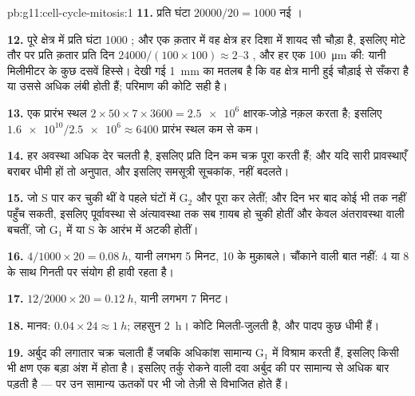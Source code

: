 \begin{solution}{pb:g11:cell-cycle-mitosis:1}
\textbf{11.} प्रति घंटा $\num{20000}/20 = 1000$ नई ।

\textbf{12.} पूरे क्षेत्र में प्रति घंटा 1000 ; और एक क़तार में
वह क्षेत्र हर दिशा में शायद सौ  चौड़ा है, इसलिए मोटे तौर पर प्रति
क़तार प्रति दिन $\num{24000}/(100 \times 100) \approx 2$--3 , और
हर एक \qty{100}{\micro m} की: यानी मिलीमीटर के कुछ दसवें हिस्से। देखी गई
\qty{1}{mm} का मतलब है कि वह क्षेत्र मानी हुई चौड़ाई से सँकरा है या
 उससे अधिक लंबी होती हैं; परिमाण की कोटि सही है।

\textbf{13.} एक प्रारंभ स्थल $2 \times 50 \times 7 \times 3600 =
\num{2.5e6}$ क्षारक-जोड़े नक़ल करता है; इसलिए
$\num{1.6e10}/\num{2.5e6} \approx 6400$ प्रारंभ स्थल कम से कम।

\textbf{14.} हर अवस्था अधिक देर चलती है, इसलिए प्रति दिन कम  चक्र
पूरा करती हैं; और यदि सारी प्रावस्थाएँ बराबर धीमी हों तो अनुपात, और इसलिए
समसूत्री सूचकांक, नहीं बदलते।

\textbf{15.} जो  S पार कर चुकी थीं वे पहले घंटों में
$\mathrm{G_2}$ और  पूरा कर लेतीं; और दिन भर बाद कोई भी
  तक नहीं पहुँच सकती, इसलिए पूर्वावस्था से
अंत्यावस्था तक सब ग़ायब हो चुकी होतीं और केवल अंतरावस्था वाली 
बचतीं, जो $\mathrm{G_1}$ में या S के आरंभ में अटकी होतीं।

\textbf{16.} $4/1000 \times 20 = \qty{0.08}{h}$, यानी लगभग 5 मिनट, 10 के
मुक़ाबले। चौंकाने वाली बात नहीं: 4 या 8  के साथ गिनती पर संयोग ही
हावी रहता है।

\textbf{17.} $12/2000 \times 20 = \qty{0.12}{h}$, यानी लगभग 7 मिनट।

\textbf{18.} मानव: $0.04 \times 24 \approx \qty{1}{h}$; लहसुन
\qty{2}{h}। कोटि मिलती-जुलती है, और पादप  कुछ धीमी हैं।

\textbf{19.} अर्बुद की  लगातार चक्र चलाती हैं जबकि अधिकांश
सामान्य  $\mathrm{G_1}$ में विश्राम करती हैं, इसलिए किसी भी क्षण
एक बड़ा अंश  में होता है। इसलिए तर्कु रोकने वाली दवा
अर्बुद की  पर सामान्य  से अधिक बार पड़ती है --- पर उन
सामान्य ऊतकों पर भी जो तेज़ी से विभाजित होते हैं।


\end{solution}
